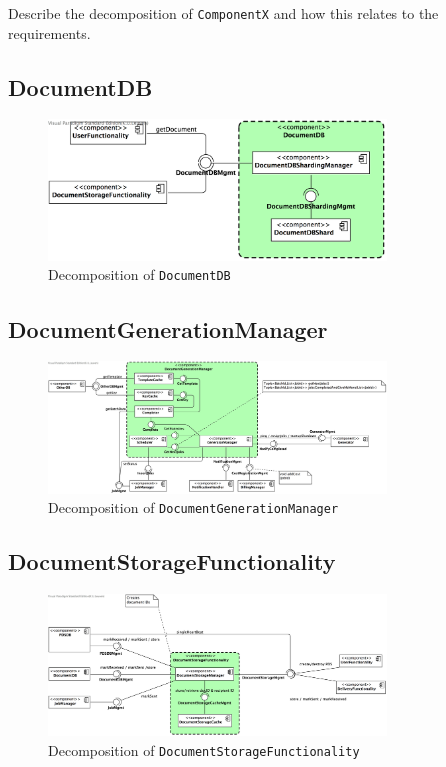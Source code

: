 \documentclass[a4paper,10pt]{article}
\begin{document}
Describe the decomposition of \texttt{ComponentX} and how this relates to the
requirements.

\subsection{DocumentDB}\label{subsec:decomp-DocumentDB}
\begin{figure}[!htp]
	\centering
	\includegraphics[width=0.8\textwidth]{DocumentDB.png}
	\caption{Decomposition of \texttt{DocumentDB}}
	\label{fig:decomp-DocumentDB}
\end{figure}
\FloatBarrier

\subsection{DocumentGenerationManager}\label{subsec:decomp-DocumentGenerationManager}
\begin{figure}[!htp]
	\centering
	\includegraphics[width=0.8\textwidth]{DocumentGenerationManager.png}
	\caption{Decomposition of \texttt{DocumentGenerationManager}}
	\label{fig:decomp-DocumentGenerationManager}
\end{figure}
\FloatBarrier

\subsection{DocumentStorageFunctionality}\label{subsec:decomp-DocumentStorageFunctionality}
\begin{figure}[!htp]
	\centering
	\includegraphics[width=0.8\textwidth]{DocumentStorageFunctionality.png}
	\caption{Decomposition of \texttt{DocumentStorageFunctionality}}
	\label{fig:decomp-DocumentStorageFunctionality}
\end{figure}
\FloatBarrier
\end{document}
